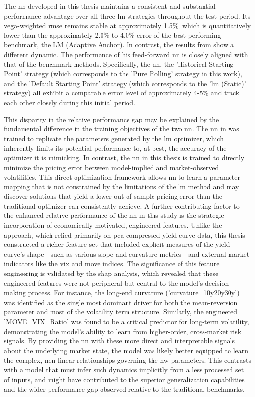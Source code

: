 The \ac{nn} developed in this thesis maintains a consistent and substantial performance advantage over all three \ac{lm} strategies throughout the test period. Its vega-weighted \ac{rmse} remains stable at approximately 1.5\%, which is quantitatively lower than the approximately 2.0\% to 4.0\% error of the best-performing benchmark, the LM (Adaptive Anchor). In contrast, the results from \textcite{hernandez2016model} show a different dynamic. The performance of his feed-forward \ac{nn} is closely aligned with that of the benchmark methods. Specifically, the \ac{nn}, the 'Historical Starting Point' strategy (which corresponds to the 'Pure Rolling' strategy in this work), and the 'Default Starting Point' strategy (which corresponds to the '\ac{lm} (Static)' strategy) all exhibit a comparable error level of approximately 4-5\% and track each other closely during this initial period.

This disparity in the relative performance gap may be explained by the fundamental difference in the training objectives of the two \ac{nn}. The \ac{nn} in \textcite{hernandez2016model} was trained to replicate the parameters generated by the \ac{lm} optimizer, which inherently limits its potential performance to, at best, the accuracy of the optimizer it is mimicking. In contrast, the \ac{nn} in this thesis is trained to directly minimize the pricing error between model-implied and market-observed volatilities. This direct optimization framework allows \ac{nn} to learn a parameter mapping that is not constrained by the limitations of the \ac{lm} method and may discover solutions that yield a lower out-of-sample pricing error than the traditional optimizer can consistently achieve. A further contributing factor to the enhanced relative performance of the \ac{nn} in this study is the strategic incorporation of economically motivated, engineered features. Unlike the \textcite{hernandez2016model} approach, which relied primarily on \ac{pca}-compressed yield curve data, this thesis constructed a richer feature set that included explicit measures of the yield curve's shape—such as various slope and curvature metrics—and external market indicators like the \ac{vix} and \ac{move} indices. The significance of this feature engineering is validated by the \ac{shap} analysis, which revealed that these engineered features were not peripheral but central to the model's decision-making process. For instance, the long-end curvature ('curvature\_10y20y30y') was identified as the single most dominant driver for both the mean-reversion parameter and most of the volatility term structure. Similarly, the engineered 'MOVE\_VIX\_Ratio' was found to be a critical predictor for long-term volatility, demonstrating the model's ability to learn from higher-order, cross-market risk signals. By providing the \ac{nn} with these more direct and interpretable signals about the underlying market state, the model was likely better equipped to learn the complex, non-linear relationships governing the \ac{hw} parameters. This contrasts with a model that must infer such dynamics implicitly from a less processed set of inputs, and might have contributed to the superior generalization capabilities and the wider performance gap observed relative to the traditional benchmarks.

